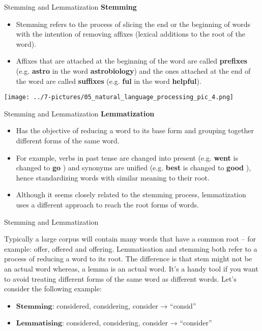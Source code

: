 \documentclass[11pt]{beamer}
\newcommand{\highlight}[1]{%
  \colorbox{yellow!100}{$\displaystyle#1$}}
\begin{document}
\begin{frame}{Stemming and Lemmatization}
\textbf{Stemming}
	\begin{itemize}
		\item Stemming refers to the process of slicing the end or the beginning of words with the intention of removing affixes (lexical additions to the root of the word).
		\item Affixes that are attached at the beginning of the word are called \textbf{prefixes} (e.g. \textbf{ astro } in the word \textbf{ astrobiology}) and the ones attached at the end of the word are called \textbf{suffixes} (e.g. \textbf{ ful} in the word \textbf{ helpful}).
	\end{itemize}
	\begin{center}
	\texttt{[image: ../7-pictures/05\_natural\_language\_processing\_pic\_4.png]}
	\end{center}
\end{frame}
\begin{frame}{Stemming and Lemmatization}
\textbf{Lemmatization}
	\begin{itemize}
		\item Has the objective of reducing a word to its base form and grouping together different forms of the same word. 
		\item For example, verbs in past tense are changed into present (e.g. \textbf{went} is changed to \textbf{ go }) and synonyms are unified (e.g. \textbf{ best } is changed to \textbf{ good }), hence standardizing words with similar meaning to their root. 
		\item Although it seems closely related to the stemming process, lemmatization uses a different approach to reach the root forms of words.
	\end{itemize}
\end{frame}
\begin{frame}{Stemming and Lemmatization}

Typically a large corpus will contain many words that have a common root – for example: offer, offered and offering. Lemmatisation and stemming both refer to a process of reducing a word to its root. The difference is that stem might not be an actual word whereas, a lemma is an actual word. It’s a handy tool if you want to avoid treating different forms of the same word as different words. Let's consider the following example:
\begin{itemize}
	\item \highlight{\textbf{Stemming}}: considered, considering, consider → “consid”
	\item \highlight{\textbf{Lemmatising}}: considered, considering, consider → “consider”
\end{itemize}
\end{frame}
\end{document}
